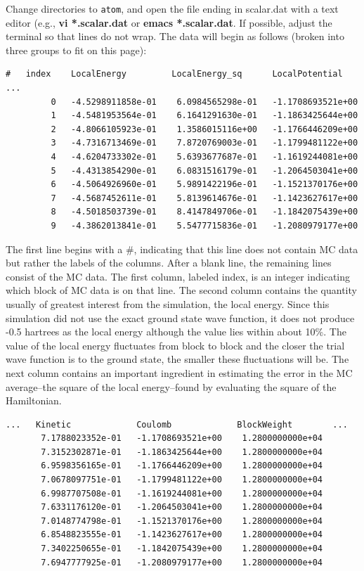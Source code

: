 Change directories to \texttt{atom}, and open the file ending in
scalar.dat with a text editor (e.g., \textbf{vi *.scalar.dat} or \textbf{emacs
*.scalar.dat}.  If possible, adjust the terminal so that lines do not wrap.
The data will begin as follows (broken into three groups to fit on this page):

\begin{shaded} 
\begin{verbatim}
#   index    LocalEnergy         LocalEnergy_sq      LocalPotential     ...
         0   -4.5298911858e-01    6.0984565298e-01   -1.1708693521e+00    
         1   -4.5481953564e-01    6.1641291630e-01   -1.1863425644e+00    
         2   -4.8066105923e-01    1.3586015116e+00   -1.1766446209e+00    
         3   -4.7316713469e-01    7.8720769003e-01   -1.1799481122e+00    
         4   -4.6204733302e-01    5.6393677687e-01   -1.1619244081e+00    
         5   -4.4313854290e-01    6.0831516179e-01   -1.2064503041e+00    
         6   -4.5064926960e-01    5.9891422196e-01   -1.1521370176e+00    
         7   -4.5687452611e-01    5.8139614676e-01   -1.1423627617e+00    
         8   -4.5018503739e-01    8.4147849706e-01   -1.1842075439e+00    
         9   -4.3862013841e-01    5.5477715836e-01   -1.2080979177e+00    
\end{verbatim}
\end{shaded}

The first line begins with a \#, indicating that this line does not contain MC
data but rather the labels of the columns.  After a blank line, the remaining
lines consist of the MC data.  The first column, labeled index, is an integer
indicating which block of MC data is on that line.  The second column contains
the quantity usually of greatest interest from the simulation, the local
energy.  Since this simulation did not use the exact ground state wave
function, it does not produce -0.5 hartrees as the local energy although the
value lies within about 10\%.  The value of the local energy fluctuates from
block to block and the closer the trial wave function is to the ground state,
the smaller these fluctuations will be.  The next column contains an important
ingredient in estimating the error in the MC average--the square of the local
energy--found by evaluating the square of the Hamiltonian.  

\begin{shaded} 
\begin{verbatim} 
...   Kinetic             Coulomb             BlockWeight        ... 
       7.1788023352e-01   -1.1708693521e+00    1.2800000000e+04   
       7.3152302871e-01   -1.1863425644e+00    1.2800000000e+04   
       6.9598356165e-01   -1.1766446209e+00    1.2800000000e+04   
       7.0678097751e-01   -1.1799481122e+00    1.2800000000e+04   
       6.9987707508e-01   -1.1619244081e+00    1.2800000000e+04   
       7.6331176120e-01   -1.2064503041e+00    1.2800000000e+04   
       7.0148774798e-01   -1.1521370176e+00    1.2800000000e+04   
       6.8548823555e-01   -1.1423627617e+00    1.2800000000e+04   
       7.3402250655e-01   -1.1842075439e+00    1.2800000000e+04   
       7.6947777925e-01   -1.2080979177e+00    1.2800000000e+04   
\end{verbatim} 
\end{shaded}

